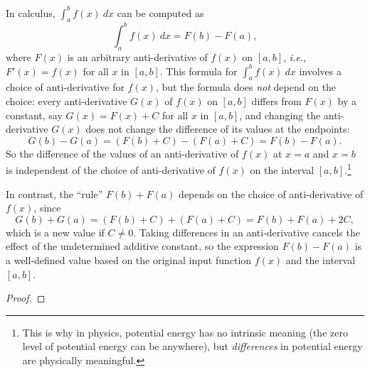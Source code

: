 \begin{exmp}
    In calculus, \(\int_{a}^{b} f(x) \ dx\) can be computed as
    \[\int_{a}^{b} f(x) \ dx = F(b) - F(a),\]
    where \(F(x)\) is an arbitrary anti-derivative of \(f(x)\) on \([a,b]\), \textit{i.e.}, \(F'(x) = f(x)\) for all \(x\) in \([a,b]\). This formula for \(\int_{a}^{b} f(x) \ dx\) involves a choice of anti-derivative for \(f(x)\), but the formula does \textit{not} depend on the choice: every anti-derivative \(G(x)\) of \(f(x)\) on \([a,b]\) differs from \(F(x)\) by a constant, say \(G(x) = F(x) + C\) for all \(x\) in \([a,b]\), and changing the anti-derivative \(G(x)\) does not change the difference of its values at the endpoints:
    \[G(b) - G(a) = (F(b) + C) - (F(a) + C) = F(b) - F(a).\]
    So the difference of the values of an anti-derivative of \(f(x)\) at \(x=a\) and \(x=b\) is independent of the choice of anti-derivative of \(f(x)\) on the interval \([a,b]\).\footnote[2]{This is why in physics, potential energy has no intrinsic meaning (the zero level of potential energy can be anywhere), but \textit{differences} in potential energy are physically meaningful.}

    In contrast, the ``rule'' \(F(b)+F(a)\) depends on the choice of anti-derivative of \(f(x)\), since
    \[G(b)+G(a) = (F(b)+ C) + (F(a) + C) = F(b) + F(a) + 2C,\]
    which is a new value if \(C \neq 0\). Taking differences in an anti-derivative cancels the effect of the undetermined additive constant, so the expression \(F(b)-F(a)\) is a well-defined value based on the original input function \(f(x)\) and the interval \([a,b]\).
\end{exmp}

\begin{note}
    \lipsum[][1-9]
\end{note}

\begin{rmrk}
    \lipsum[][1-9]
\end{rmrk}

\begin{lemm}
    \lipsum[][1-4]
\end{lemm}

\begin{proof}
    \lipsum[1]
\end{proof}

\begin{thrm}
    \lipsum[][1-4]
\end{thrm}

